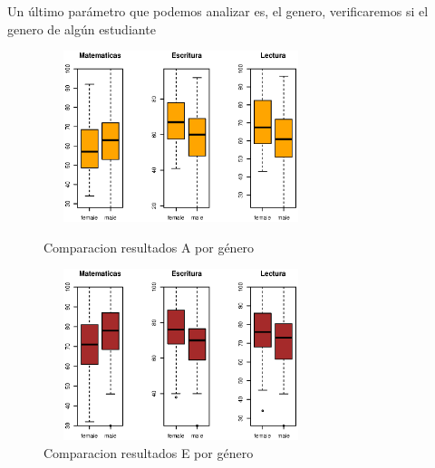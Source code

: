 \documentclass{article}
\begin{document}
    Un \'ultimo par\'ametro que podemos analizar es, el genero, verificaremos si el genero de alg\'un estudiante

    \begin{figure}[H]
        \begin{minipage}[b]{0.45\linewidth}
            \includegraphics[width=8cm,height = 5cm]{Output/Plots/figure19.eps}
            \vspace*{-8.5mm}
            \caption{Comparacion resultados A por g\'enero}
            \label{fig:minipage1}
        \end{minipage}
        \hspace{0.2cm}
        \begin{minipage}[b]{0.45\linewidth}
            \includegraphics[width=8cm,height = 5cm]{Output/Plots/figure20.eps}
            \vspace*{-9mm}
            \caption{Comparacion resultados E por g\'enero}
            \label{fig:minipage2}
        \end{minipage}
    \end{figure}
\end{document}

